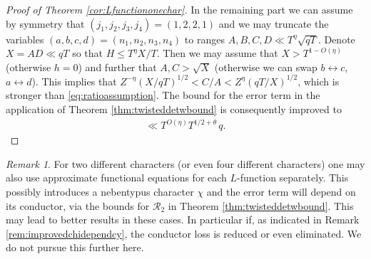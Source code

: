 \documentclass[12pt]{amsart}
\theoremstyle{definition}
\theoremstyle{remark}
\newtheorem{remark}{Remark}
\numberwithin{equation}{section}
\newcommand{\1}{{\mathbf 1}}
\begin{document}
\begin{proof}[Proof of Theorem \ref{cor:Lfunctiononechar}]
In the remaining part we can assume by symmetry that $(j_1,j_2,j_3,j_4)= (1,2,2,1)$ and we may truncate the variables $(a,b,c,d)=(n_1,n_2,n_3,n_4)$ to ranges $A,B,C,D \ll T^\eta \sqrt{q T}$. Denote $X=AD \ll q T$ so that $H \leq T^\eta X/T$. Then we may assume that $X > T^{1-O(\eta)}$ (otherwise $h=0$) and further that $A,C > \sqrt{X}$ (otherwise we can swap $b \leftrightarrow c$, $a\leftrightarrow d$). This implies that $Z^{-\eta} (X/qT)^{1/2} < C/A < Z^{\eta} (qT/X)^{1/2}$, which is stronger than \eqref{eq:ratioassumption}. The bound for the error term in the application of Theorem \ref{thm:twisteddetwbound} is consequently improved to
\begin{align*}
 \ll   T^{O(\eta)}   T^{1/2+\theta}\,  q.
\end{align*}
\end{proof}

\begin{remark}
For two different characters (or even four different characters) one may also use approximate functional equations for each $L$-function separately. This possibly introduces a nebentypus character $\chi$ and the error term will depend on its conductor, via the bounds for $\mathcal{R}_2$ in Theorem \ref{thm:twisteddetwbound}. This may lead to better results in these cases. In particular if, as indicated in Remark \ref{rem:improvedchidependcy}, the conductor loss is reduced or even eliminated.  We do not pursue this further here.
\end{remark}





\end{document}
